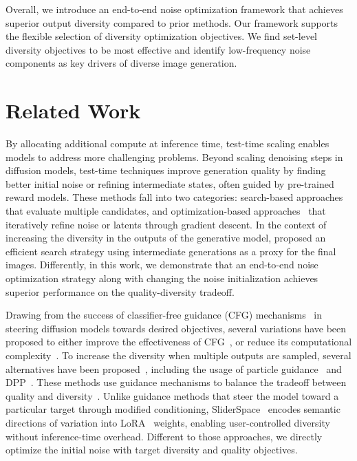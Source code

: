 \documentclass[10pt,twocolumn,letterpaper]{article}
\newcommand{\myparagraph}[1]{\vspace{1pt}\noindent{\bf{#1}}}
\begin{document}
Overall, we introduce an end-to-end noise optimization framework that achieves superior output diversity compared to prior methods. Our framework supports the flexible selection of diversity optimization objectives. We find set-level diversity objectives to be most effective and identify low-frequency noise components as key drivers of diverse image generation.



\section{Related Work}
\myparagraph{Inference-Time Scaling.} By allocating additional compute at inference time, test-time scaling enables models to address more challenging problems. Beyond scaling denoising steps in diffusion models, test-time techniques improve generation quality by finding better initial noise or refining intermediate states, often guided by pre-trained reward models. These methods fall into two categories: search-based approaches~\cite{ma2025inference,uehara2025rewardguidediterativerefinementdiffusion,uehara2025inferencetimealignmentdiffusionmodels,imageselect} that evaluate multiple candidates, and optimization-based approaches~\cite{doodl,dflow,novack2024dittodiffusioninferencetimetoptimization,dno,initno,tang2024inference} that iteratively refine noise or latents through gradient descent. In the context of increasing the diversity in the outputs of the generative model, \citet{gi} proposed an efficient search strategy using intermediate generations as a proxy for the final images. Differently, in this work, we demonstrate that an end-to-end noise optimization strategy along with changing the noise initialization achieves superior performance on the quality-diversity tradeoff.


\myparagraph{Guidance Mechanisms.} Drawing from the success of classifier-free guidance (CFG) mechanisms~\cite{cfg,chung2024cfg++} in steering diffusion models towards desired objectives, several variations have been proposed to either improve the effectiveness of CFG~\cite{pag,pag2,kwon2025tcfg}, or reduce its computational complexity~\cite{noiserefine,intervalguidance,autocfg}. To increase the diversity when multiple outputs are sampled, several alternatives have been proposed~\cite{kirchhof2024shielded, singh2024negative}, including the usage of particle guidance~\cite{particle} and DPP~\cite{kulesza2012determinantal,morshed2025diverseflow}. These methods use guidance mechanisms to balance the tradeoff between quality and diversity~\cite{sadat2023cads,sadat2024eliminating,ifriqi2025entropy}. 
Unlike guidance methods that steer the model toward a particular target through modified conditioning, SliderSpace~\cite{gandikota2025sliderspace} encodes semantic directions of variation into LoRA~\cite{lora} weights, enabling user-controlled diversity without inference-time overhead.
Different to those approaches, we directly optimize the initial noise with target diversity and quality objectives.
\end{document}
